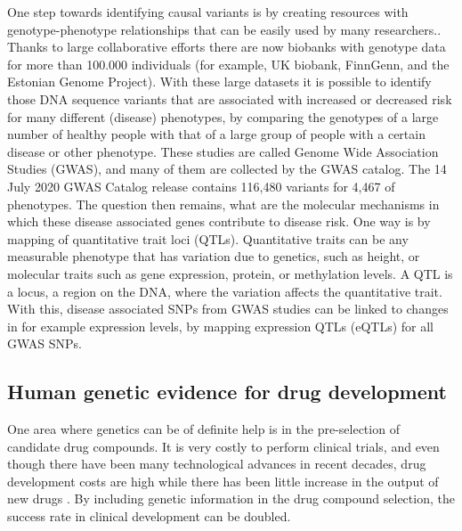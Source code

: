 One step towards identifying causal variants is by creating resources with genotype-phenotype relationships that can be easily used by many researchers.\cite{claussnitzerBriefHistoryHuman2020b}. Thanks to large collaborative efforts there are now biobanks with genotype data for more than 100.000 individuals (for example, UK biobank\cite{sudlowUKBiobankOpen2015}, FinnGenn\cite{fingennFinnGenDocumentationR32020}, and the Estonian Genome Project\cite{metspaluEstonianGenomeProject2004}). With these large datasets it is possible to identify those DNA sequence variants that are associated with increased or decreased risk for many different (disease) phenotypes, by comparing the genotypes of a large number of healthy people with that of a large group of people with a certain disease or other phenotype. These studies are called Genome Wide Association Studies (GWAS), and many of them are collected by the GWAS catalog\cite{bunielloNHGRIEBIGWASCatalog2019}. The 14 July 2020 GWAS Catalog release contains 116,480 variants for 4,467 of phenotypes. The question then remains, what are the molecular mechanisms in which these disease associated genes contribute to disease risk. One way is by mapping of quantitative trait loci\cite{membersofthecomplextraitconsortiumNatureIdentificationQuantitative2003} (QTLs). Quantitative traits can be any measurable phenotype that has variation due to genetics, such as height, or molecular traits such as gene expression, protein, or methylation levels. A QTL is a locus, a region on the DNA, where the variation affects the quantitative trait. With this, disease associated SNPs from GWAS studies can be linked to changes in for example expression levels, by mapping expression QTLs (eQTLs) for all GWAS SNPs.


\subsection{Human genetic evidence for drug development}
One area where genetics can be of definite help is in the pre-selection of candidate drug compounds. It is very costly to perform clinical trials, and even though there have been many technological advances in recent decades, drug development costs are high while there has been little increase in the output of new drugs \cite{cookLessonsLearnedFate2014a}. By including genetic information in the drug compound selection, the success rate in clinical development can be doubled\cite{nelsonSupportHumanGenetic2015b}. 

